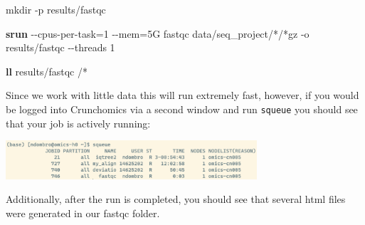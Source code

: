 \documentclass[
  letterpaper,
  DIV=11,
  numbers=noendperiod]{scrreprt}
\newenvironment{Shaded}{}{}
\newcommand{\AttributeTok}[1]{\textcolor[rgb]{0.84,0.23,0.29}{#1}}
\newcommand{\ExtensionTok}[1]{\textcolor[rgb]{0.84,0.23,0.29}{\textbf{#1}}}
\newcommand{\FunctionTok}[1]{\textcolor[rgb]{0.44,0.26,0.76}{#1}}
\newcommand{\NormalTok}[1]{\textcolor[rgb]{0.14,0.16,0.18}{#1}}
\newcommand{\OperatorTok}[1]{\textcolor[rgb]{0.14,0.16,0.18}{#1}}
\newcommand{\PreprocessorTok}[1]{\textcolor[rgb]{0.84,0.23,0.29}{#1}}
\begin{document}
\begin{Shaded}
\begin{Highlighting}[]
\FunctionTok{mkdir} \AttributeTok{{-}p}\NormalTok{ results/fastqc }

\ExtensionTok{srun} \AttributeTok{{-}{-}cpus{-}per{-}task}\OperatorTok{=}\NormalTok{1 }\AttributeTok{{-}{-}mem}\OperatorTok{=}\NormalTok{5G fastqc data/seq\_project/}\PreprocessorTok{*}\NormalTok{/}\PreprocessorTok{*}\NormalTok{gz }\AttributeTok{{-}o}\NormalTok{ results/fastqc  }\AttributeTok{{-}{-}threads}\NormalTok{ 1}

\ExtensionTok{ll}\NormalTok{ results/fastqc /}\PreprocessorTok{*}
\end{Highlighting}
\end{Shaded}

Since we work with little data this will run extremely fast, however, if
you would be logged into Crunchomics via a second window and run
\texttt{squeue} you should see that your job is actively running:

\begin{center}
\includegraphics[width=0.7\textwidth,height=\textheight]{../img/squeue2.png}
\end{center}

Additionally, after the run is completed, you should see that several
html files were generated in our fastqc folder.
\end{document}
